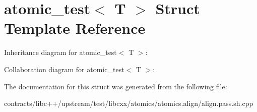 \hypertarget{structatomic__test}{}\section{atomic\+\_\+test$<$ T $>$ Struct Template Reference}
\label{structatomic__test}


Inheritance diagram for atomic\+\_\+test$<$ T $>$\+:


Collaboration diagram for atomic\+\_\+test$<$ T $>$\+:


The documentation for this struct was generated from the following file\+:\begin{DoxyCompactItemize}
\item 
contracts/libc++/upstream/test/libcxx/atomics/atomics.\+align/align.\+pass.\+sh.\+cpp\end{DoxyCompactItemize}
